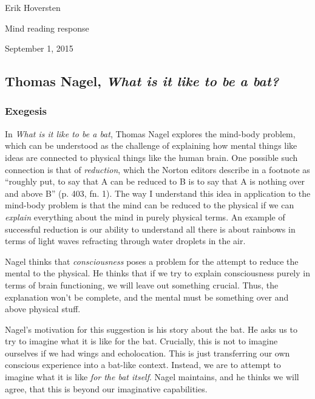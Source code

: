 \documentclass{article}
\begin{document}
{\setlength{\parindent}{0cm}
Erik Hoversten

\vspace{-3mm}

Mind reading response

\vspace{-3mm}

September 1, 2015

\vspace{-3mm}
}

\begin{center}
\subsection*{Thomas Nagel, \textit{What is it like to be a bat?}}
\end{center}

\subsubsection*{Exegesis}

In \emph{What is it like to be a bat}, Thomas Nagel explores the
mind-body problem, which can be understood as the challenge of
explaining how mental things like ideas are connected to physical things
like the human brain. One possible such connection is that of
\emph{reduction}, which the Norton editors describe in a footnote as
``roughly put, to say that A can be reduced to B is to say that A is
nothing over and above B'' (p. 403, fn. 1). The way I understand this
idea in application to the mind-body problem is that the mind can be
reduced to the physical if we can \emph{explain} everything about the
mind in purely physical terms. An example of successful reduction is our
ability to understand all there is about rainbows in terms of light
waves refracting through water droplets in the air.

Nagel thinks that \emph{consciousness} poses a problem for the attempt
to reduce the mental to the physical. He thinks that if we try to
explain consciousness purely in terms of brain functioning, we will
leave out something crucial. Thus, the explanation won't be complete,
and the mental must be something over and above physical stuff.

Nagel's motivation for this suggestion is his story about the bat. He
asks us to try to imagine what it is like for the bat. Crucially, this
is not to imagine ourselves if we had wings and echolocation. This is
just transferring our own conscious experience into a bat-like context.
Instead, we are to attempt to imagine what it is like \emph{for the bat
itself}. Nagel maintains, and he thinks we will agree, that this is
beyond our imaginative capabilities.
\end{document}
